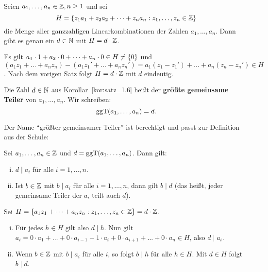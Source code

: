 	\begin{korollar}
		\label{kor:satz_1.6}
		Seien $a_1,\dots,a_n \in \mathbb{Z}, n \geq 1$ und sei
		\[
			H = \{z_1a_1 + z_2a_2 + \dots + z_na_n : z_1,\dots,z_n \in \mathbb{Z}\}
		\]
		die Menge aller ganzzahligen Linearkombinationen der Zahlen $a_1,\dots,a_n$.
		Dann gibt es genau ein $d \in \mathbb{N}$ mit $H = d \cdot \mathbb{Z}$.
	\end{korollar}

	\begin{beweis}
		Es gilt $a_1 \cdot 1 + a_2 \cdot 0 + \dots + a_n \cdot 0 \in H \neq \{0\}$ und $(a_1z_1 + \dots + a_nz_n) - (a_1z_1' + \dots + a_nz_n') = a_1(z_1-z_1') + \dots + a_n(z_n-z_n') \in H$.
		Nach dem vorigen Satz folgt $H = d \cdot \mathbb{Z}$ mit $d$ eindeutig.		
	\end{beweis}
	\newpage
	\begin{definition}
		Die Zahl $d \in \mathbb{N}$ aus Korollar~\ref{kor:satz_1.6} heißt der \textbf{größte gemeinsame Teiler} von $a_1,\dots,a_n$. 
		Wir schreiben:
		\[
			\operatorname{ggT}(a_1,\dots,a_n) = d.
		\]
	\end{definition}

	Der Name \enquote{größter gemeinsamer Teiler} ist berechtigt und passt zur Definition aus der Schule:
	
	\begin{lemma}
		\label{lem:1.7}
		Sei $a_1,\dots,a_n \in \mathbb{Z}$ und $d = \operatorname{ggT}(a_1,\dots,a_n)$. \marginnote{[7]}
		Dann gilt:
		\begin{enumerate}[(i)]
			\item $d \mid a_i$ für alle $i = 1,\dots,n$.
			\item Ist $b \in \mathbb{Z}$ mit $b \mid a_i$ für alle $i=1,\dots,n$, dann gilt $b \mid d$ (das heißt, jeder gemeinsame Teiler der $a_i$ teilt auch $d$).
		\end{enumerate}
	\end{lemma}

	\begin{beweis}
		Sei $H = \{a_1z_1 + \dots + a_nz_n : z_1,\dots,z_n \in \mathbb{Z}\} = d \cdot \mathbb{Z}$.
		\begin{enumerate}[(i)]
			\item Für jedes $h \in H$ gilt also $d \mid h$.
			Nun gilt $a_i = 0 \cdot a_1 + \dots + 0 \cdot a_{i-1} + 1 \cdot a_i + 0 \cdot a_{i+1} + \dots + 0 \cdot a_n \in H$, also $d \mid a_i$.
			\item Wenn $b \in \mathbb{Z}$ mit $b \mid a_i$ für alle $i$, so folgt $b \mid h$ für alle $h \in H$.
			Mit $d \in H$ folgt $b \mid d$.
		\end{enumerate}
	\end{beweis}
\cleardoubleoddemptypage